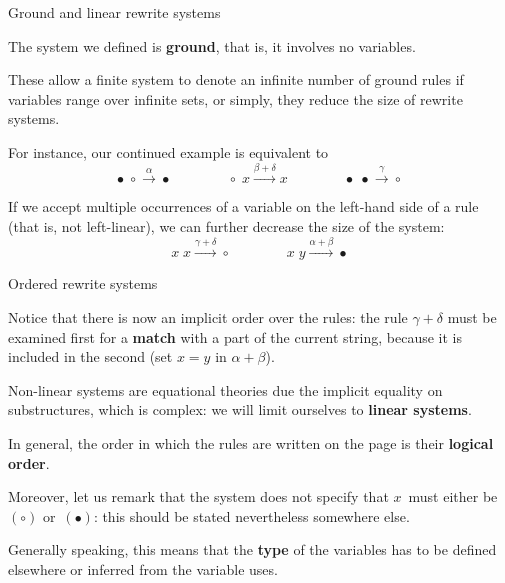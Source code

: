 %
\begin{frame}{Ground and linear rewrite systems}

  The system we defined is \textbf{ground}, that is, it involves no
  variables.

  \bigskip

  These allow a finite system to denote an infinite number of ground
  rules if variables range over infinite sets, or simply, they reduce
  the size of rewrite systems.

  \bigskip

  For instance, our continued example is equivalent to
  \begin{equation*}
    \bullet \; \circ \xrightarrow{\alpha} \bullet
    \qquad\qquad
    \circ \; x \xrightarrow{\beta+\delta} x
    \qquad\qquad
    \bullet \; \bullet \xrightarrow{\gamma} \circ
  \end{equation*}

  \medskip

  If we accept multiple occurrences of a variable on the
  left\hyp{}hand side of a rule (that is, not left\hyp{}linear), we
  can further decrease the size of the system:
  \begin{equation*}
    x  \; x \xrightarrow{\gamma+\delta} \circ\qquad\qquad
    x  \; y \xrightarrow{\alpha+\beta} \bullet
  \end{equation*}

\end{frame}

%
\begin{frame}{Ordered rewrite systems}

  Notice that there is now an implicit order over the rules: the rule
  \(\gamma+\delta\) must be examined first for a \textbf{match} with a
  part of the current string, because it is included in the second
  (set \(x=y\) in \(\alpha+\beta\)).

  \bigskip

  Non\hyp{}linear systems are equational theories due the implicit
  equality on substructures, which is complex: we will limit ourselves
  to \textbf{linear systems}.

  \bigskip

  In general, the order in which the rules are written on the page is
  their \textbf{logical order}.

  \bigskip

  Moreover, let us remark that the system does not specify that
  \(x\)~must either be~\((\circ)\) or~\((\bullet)\): this should be
  stated nevertheless somewhere else.

  \bigskip

  Generally speaking, this means that the \textbf{type} of the
  variables has to be defined elsewhere or inferred from the variable
  uses.

\end{frame}
